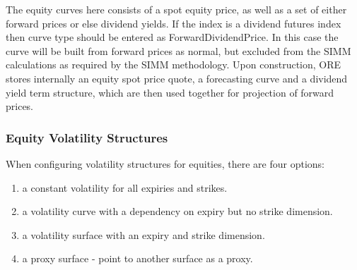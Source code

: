 The equity curves here consists of a spot equity price, as well as a set of either forward prices or else dividend
yields. If the index is a dividend futures index then curve type should be entered as ForwardDividendPrice. In this case the curve will be built from forward prices as normal, but excluded from the SIMM calculations as required by the SIMM methodology.
Upon construction, ORE stores internally an equity spot price quote, a forecasting curve and a dividend yield
term structure, which are then used together for projection of forward prices.

\subsubsection{Equity Volatility Structures}

When configuring volatility structures for equities, there are four options:
\begin{enumerate}
\item a constant volatility for all expiries and strikes.
\item a volatility curve with a dependency on expiry but no strike dimension.
\item a volatility surface with an expiry and strike dimension.
\item a proxy surface - point to another surface as a proxy.
\end{enumerate}

